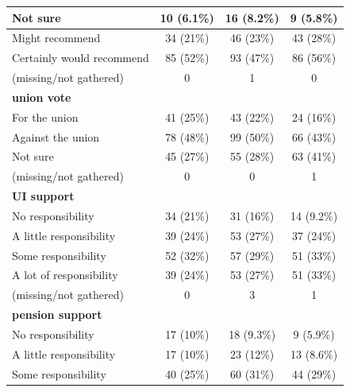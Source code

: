 \documentclass[
  11pt,
  oneside]{article}
\begin{document}
\begin{table}
\begin{tabular}[t]{l|c|c|c}
\hline
\hspace{1em}Not sure & 10 (6.1\%) & 16 (8.2\%) & 9 (5.8\%)\\
\hline
\hspace{1em}Might recommend & 34 (21\%) & 46 (23\%) & 43 (28\%)\\
\hline
\hspace{1em}Certainly would recommend & 85 (52\%) & 93 (47\%) & 86 (56\%)\\
\hline
\hspace{1em}(missing/not gathered) & 0 & 1 & 0\\
\hline
\textbf{union vote} &  &  & \\
\hline
\hspace{1em}For the union & 41 (25\%) & 43 (22\%) & 24 (16\%)\\
\hline
\hspace{1em}Against the union & 78 (48\%) & 99 (50\%) & 66 (43\%)\\
\hline
\hspace{1em}Not sure & 45 (27\%) & 55 (28\%) & 63 (41\%)\\
\hline
\hspace{1em}(missing/not gathered) & 0 & 0 & 1\\
\hline
\textbf{UI support} &  &  & \\
\hline
\hspace{1em}No responsibility & 34 (21\%) & 31 (16\%) & 14 (9.2\%)\\
\hline
\hspace{1em}A little responsibility & 39 (24\%) & 53 (27\%) & 37 (24\%)\\
\hline
\hspace{1em}Some responsibility & 52 (32\%) & 57 (29\%) & 51 (33\%)\\
\hline
\hspace{1em}A lot of responsibility & 39 (24\%) & 53 (27\%) & 51 (33\%)\\
\hline
\hspace{1em}(missing/not gathered) & 0 & 3 & 1\\
\hline
\textbf{pension support} &  &  & \\
\hline
\hspace{1em}No responsibility & 17 (10\%) & 18 (9.3\%) & 9 (5.9\%)\\
\hline
\hspace{1em}A little responsibility & 17 (10\%) & 23 (12\%) & 13 (8.6\%)\\
\hline
\hspace{1em}Some responsibility & 40 (25\%) & 60 (31\%) & 44 (29\%)\\

\end{tabular}
\end{table}
\end{document}
